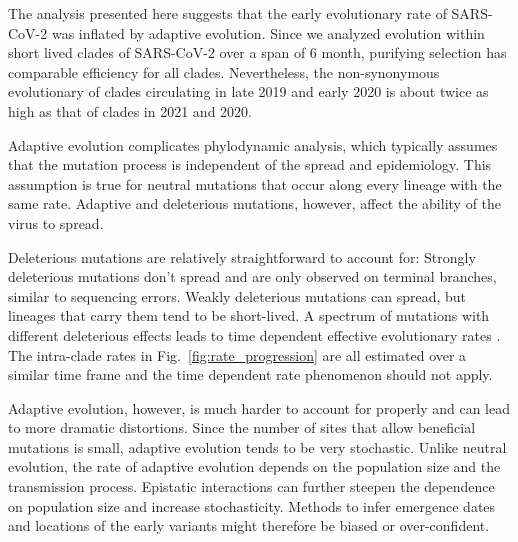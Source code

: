 \documentclass[aps,rmp, twocolumn]{revtex4}
\begin{document}
The analysis presented here suggests that the early evolutionary rate of SARS-CoV-2 was inflated by adaptive evolution.
Since we analyzed evolution within short lived clades of SARS-CoV-2 over a span of 6 month, purifying selection has comparable efficiency for all clades.
Nevertheless, the non-synonymous evolutionary of clades circulating in late 2019 and early 2020 is about twice as high as that of clades in 2021 and 2020.

Adaptive evolution complicates phylodynamic analysis, which typically assumes that the mutation process is independent of the spread and epidemiology.
This assumption is true for neutral mutations that occur along every lineage with the same rate.
Adaptive and deleterious mutations, however, affect the ability of the virus to spread.

Deleterious mutations are relatively straightforward to account for: Strongly deleterious mutations don't spread and are only observed on terminal branches, similar to sequencing errors.
Weakly deleterious mutations can spread, but lineages that carry them tend to be short-lived.
A spectrum of mutations with different deleterious effects leads to time dependent effective evolutionary rates \citep{wertheim_purifying_2011}.
The intra-clade rates in Fig.~\ref{fig:rate_progression} are all estimated over a similar time frame and the time dependent rate phenomenon should not apply.

Adaptive evolution, however, is much harder to account for properly and can lead to more dramatic distortions.
Since the number of sites that allow beneficial mutations is small, adaptive evolution tends to be very stochastic.
Unlike neutral evolution, the rate of adaptive evolution depends on the population size and the transmission process.
Epistatic interactions can further steepen the dependence on population size and increase stochasticity.
Methods to infer emergence dates and locations of the early variants might therefore be biased or over-confident.





\appendix



\end{document}
